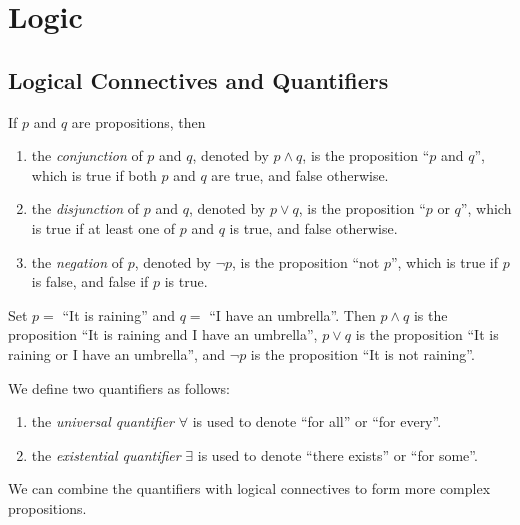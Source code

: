 \chapter{Logic}
\section{Logical Connectives and Quantifiers}
\begin{definition}
    If $p$ and $q$ are propositions, then
    \begin{enumerate}[itemindent=0ex, itemsep=0pt, label=\upshape{(\alph*)}]
        \item the \emph{conjunction} of $p$ and $q$, denoted by $p \wedge q$, is the proposition ``$p$ and $q$'', which is true if both $p$ and $q$ are true, and false otherwise.
        \item the \emph{disjunction} of $p$ and $q$, denoted by $p \vee q$, is the proposition ``$p$ or $q$'', which is true if at least one of $p$ and $q$ is true, and false otherwise.
        \item the \emph{negation} of $p$, denoted by $\neg p$, is the proposition ``not $p$'', which is true if $p$ is false, and false if $p$ is true.
    \end{enumerate}
\end{definition}

\begin{example}
    Set $p=$ ``It is raining'' and $q=$ ``I have an umbrella''. Then $p \wedge q$ is the proposition ``It is raining and I have an umbrella'', $p \vee q$ is the proposition ``It is raining or I have an umbrella'', and $\neg p$ is the proposition ``It is not raining''.
\end{example}

\begin{definition}
    We define two quantifiers as follows:
    \begin{enumerate}[itemindent=0ex, itemsep=0pt, label=\upshape{(\alph*)}]
        \item the \emph{universal quantifier} $\forall$ is used to denote ``for all'' or ``for every''.
        \item the \emph{existential quantifier} $\exists$ is used to denote ``there exists'' or ``for some''.
    \end{enumerate}
\end{definition}

We can combine the quantifiers with logical connectives to form more complex propositions. 

